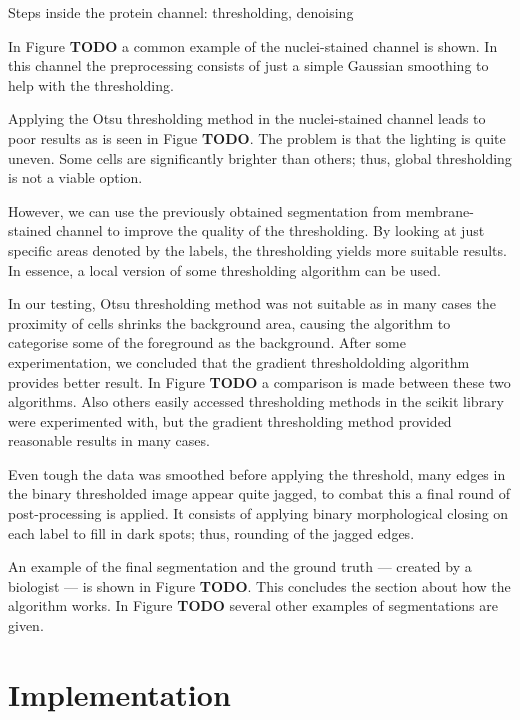\documentclass[
  digital,     %
  oneside,     %
  nosansbold,  %
  nocolorbold, %
  lof,         %
  lot,         %
]{fithesis4}
\begin{document}
Steps inside the protein channel: thresholding, denoising

In Figure \textbf{TODO} a common example of the nuclei-stained channel is shown.
In this channel the preprocessing consists of just a simple Gaussian smoothing
to help with the thresholding.

Applying the Otsu thresholding method in the nuclei-stained channel leads to
poor results as is seen in Figue \textbf{TODO}. The problem is that the lighting
is quite uneven. Some cells are significantly brighter than others; thus, global
thresholding is not a viable option.

However, we can use the previously obtained segmentation from membrane-stained
channel to improve the quality of the thresholding. By looking at just specific
areas denoted by the labels, the thresholding yields more suitable results. In
essence, a local version of some thresholding algorithm can be used.

In our testing, Otsu thresholding method was not suitable as in many cases the
proximity of cells shrinks the background area, causing the algorithm to
categorise some of the foreground as the background. After some experimentation,
we concluded that the gradient thresholdolding algorithm provides better result.
In Figure \textbf{TODO} a comparison is made between these two algorithms. Also
others easily accessed thresholding methods in the scikit library were
experimented with, but the gradient thresholding method provided reasonable
results in many cases.

Even tough the data was smoothed before applying the threshold, many edges in
the binary thresholded image appear quite jagged, to combat this a final round
of post-processing is applied. It consists of applying binary morphological
closing on each label to fill in dark spots; thus, rounding of the jagged edges.

An example of the final segmentation and the ground truth --- created by a
biologist --- is shown in Figure \textbf{TODO}. This concludes the section about
how the algorithm works. In Figure \textbf{TODO} several other examples of
segmentations are given.


\chapter{Implementation}
\end{document}
